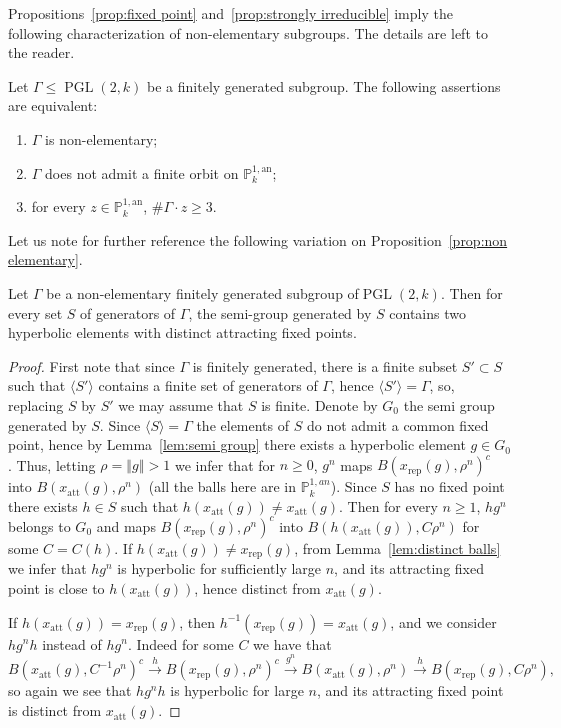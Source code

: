 \documentclass[AHL,Unicode,longabstracts]{cedram}
\DeclareMathOperator{\PGL}{PGL}
\newcommand{\norm}[1]{\left\Vert#1\right\Vert}
\newcommand{\PP}{\mathbb{P}}
\newcommand{\att}{\mathrm{att}}
\newcommand{\rep}{\mathrm{rep}}
\newcommand{\PGLk}{\PGL(2, k)}
\newcommand{\inv}{^{-1}}
\begin{document}
Propositions~\ref{prop:fixed point} and~\ref{prop:strongly irreducible} imply the following characterization of non-elementary subgroups. The details are left to the reader.

\begin{prop}
Let $\Gamma\leq \PGLk$ be a finitely generated subgroup. The following assertions are equivalent:
\begin{enumerate}
\item $\Gamma$ is non-elementary;
\item $\Gamma$ does not admit a finite orbit on $\PP^{1, \mathrm{an}}_k$;
\item for every $z\in \PP^{1, \mathrm{an}}_k$, $\# \Gamma \cdot z\geq 3$.
\end{enumerate}
\end{prop}

Let us note for further reference the following variation on Proposition~\ref{prop:non elementary}.

\begin{lemm}\label{lem:proximal semi group}
Let $\Gamma$ be a non-elementary finitely generated subgroup of\linebreak $\PGLk$. Then for every set $S$ of generators of $\Gamma$, the semi-group generated by $S$ contains two hyperbolic elements with distinct attracting fixed points.
\end{lemm}

\begin{proof}
First note that since $\Gamma$ is finitely generated, there is a finite subset $S'\subset S$ such that $\langle S'\rangle$ contains a finite set of generators of $\Gamma$, hence $\langle S'\rangle = \Gamma$, so, replacing $S$ by $S'$ we may assume that $S$ is finite. Denote by $G_0$ the semi group generated by $S$. Since $\langle S\rangle = \Gamma$ the elements of $S$ do not admit a common fixed point, hence by Lemma~\ref{lem:semi group} there exists a hyperbolic element $g\in G_0$. Thus, letting $\rho = \norm{g}>1$ we infer that for $n\geq 0$, $g^n$ maps $B(x_\rep(g), \rho^n)^c$ into $B(x_\att(g), \rho^n)$ (all the balls here are in $\PP^{1, an}_k$). Since $S$ has no fixed point there exists $h\in S$ such that $h(x_\att(g))\neq x_\att(g)$. Then for every $n\geq 1$, $hg^n$ belongs to $G_0$ and maps $B(x_\rep(g), \rho^n)^c$ into $B(h(x_\att(g)), C\rho^n)$ for some $C = C(h)$. If $h(x_\att(g))\neq x_\rep(g)$, from Lemma~\ref{lem:distinct balls} we infer that $hg^n$ is hyperbolic for sufficiently large $n$, and its attracting fixed point is close to $h(x_\att(g))$, hence distinct from $x_\att(g)$.

If $h(x_\att(g))= x_\rep(g)$, then $h\inv(x_\rep(g)) =x_\att(g)$, and we consider $hg^n h$ instead of $hg^n$. Indeed for some $C$ we have that
\[
B(x_\att(g), C\inv\rho^n)^c\overset{h}\longrightarrow B(x_\rep(g), \rho^n)^c\overset{g^n}\longrightarrow B(x_\att(g), \rho^n)
\overset{h}\longrightarrow B(x_\rep(g), C \rho^n),
\]
so again we see that $hg^nh$ is hyperbolic for large $n$, and its attracting fixed point is distinct from $x_\att(g)$.
\end{proof}
\end{document}
